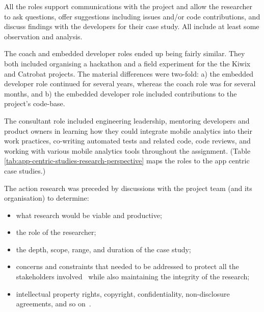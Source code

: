 All the roles support communications with the project and allow the researcher to ask questions, offer suggestions including issues and/or code contributions, and discuss findings with the developers for their case study. All include at least some observation and analysis. 

The coach and embedded developer roles ended up being fairly similar. They both included organising a hackathon and a field experiment for the the Kiwix and Catrobat projects. The material differences were two-fold: a) the embedded developer role continued for several years, whereas the coach role was for several months, and b) the embedded developer role included contributions to the project's code-base.

The consultant role included engineering leadership, mentoring developers and product owners in learning how they could integrate mobile analytics into their work practices, co-writing automated tests and related code, code reviews, and working with various mobile analytics tools throughout the assignment. (Table \ref{tab:app-centric-studies-research-perspective} maps the roles to the app centric case studies.)

The action research was preceded by discussions with the project team (and its organisation) to determine: 

\begin{itemize}
\item what research would be viable and productive; 
\item the role of the researcher; 
\item the depth, scope, range, and duration of the case study; 
\item concerns and constraints that needed to be addressed to protect all the stakeholders involved~ while also maintaining the integrity of the research;
\item intellectual property rights, copyright, confidentiality, non-disclosure agreements, and so on~.
\end{itemize}

